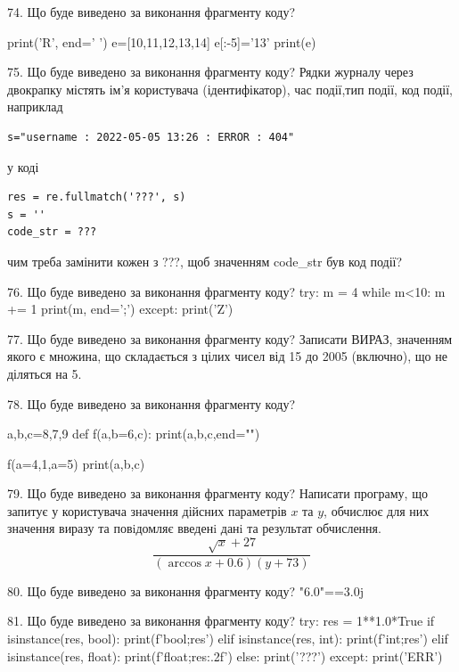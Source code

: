 \documentclass[11pt]{article}
\begin{document}
74. Що буде виведено за виконання фрагменту коду?

print('R', end=' ')
e=[10,11,12,13,14]
e[:-5]='13'
print(e)



75. Що буде виведено за виконання фрагменту коду?
Рядки журналу через двокрапку містять ім'я користувача (ідентифікатор), час події,тип події, код події, наприклад
\begin{verbatim}
s="username : 2022-05-05 13:26 : ERROR : 404"
\end{verbatim}
у коді 
\begin{verbatim}
res = re.fullmatch('???', s) 
s = ''
code_str = ??? 
\end{verbatim}
чим треба замінити кожен з ???, щоб значенням code\_str був код події? 




76. Що буде виведено за виконання фрагменту коду?
try:
    m = 4
    while m<10:
        m += 1
    print(m, end=';')
except:
    print('Z')


77. Що буде виведено за виконання фрагменту коду?
Записати ВИРАЗ, значенням якого є множина, що складається з цілих чисел від 15 до 2005 (включно), що не діляться на 5.

78. Що буде виведено за виконання фрагменту коду?

a,b,c=8,7,9
def f(a,b=6,c):
    print(a,b,c,end="")

f(a=4,1,a=5)
print(a,b,c)



79. Що буде виведено за виконання фрагменту коду?
Написати програму, що запитує у користувача значення дійсних параметрів $x$ та $y$, обчислює для них значення виразу та повiдомляє введенi данi та результат обчислення.
$$\frac{\sqrt x + 27}{(\arccos x + 0.6) (y + 73)}$$ 



80. Що буде виведено за виконання фрагменту коду?
"6.0"==3.0j

81. Що буде виведено за виконання фрагменту коду?
try:
    res = 1**1.0*True
    if isinstance(res, bool):
        print(f'bool;{res}')
    elif isinstance(res, int):
        print(f'int;{res}')
    elif isinstance(res, float):
        print(f'float;{res:.2f}')
    else:
        print('???')
except:
    print('ERR')
\end{document}
